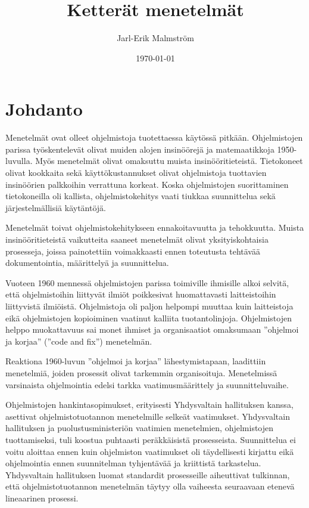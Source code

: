\documentclass[finnish]{tktltiki2}
\title{Ketterät menetelmät}
\author{Jarl-Erik Malmström}
\date{\today}
\theoremstyle{definition}
\theoremstyle{remark}
\begin{document}

\maketitle        %
\makeabstract     %

\tableofcontents  %
\newpage          %



\section{Johdanto}
 
Menetelmät ovat olleet ohjelmistoja tuotettaessa käytössä pitkään. Ohjelmistojen parissa työskentelevät olivat muiden alojen insinöörejä ja matemaatikkoja 1950-luvulla. Myös menetelmät olivat omaksuttu muista insinööritieteistä. Tietokoneet olivat kookkaita sekä käyttökustannukset olivat ohjelmistoja tuottavien insinöörien palkkoihin verrattuna korkeat. Koska ohjelmistojen suorittaminen tietokoneilla oli kallista, ohjelmistokehitys vaati tiukkaa suunnittelua sekä järjestelmällisiä käytäntöjä\cite{BOE06}.   

Menetelmät toivat ohjelmistokehitykseen ennakoitavuutta ja tehokkuutta. Muista insinööritieteistä vaikutteita saaneet menetelmät olivat yksityiskohtaisia prosesseja, joissa painotettiin voimakkaasti ennen toteutusta tehtävää dokumentointia, määrittelyä ja suunnittelua\cite{FOW01a}.

Vuoteen 1960 mennessä ohjelmistojen parissa toimiville ihmisille alkoi selvitä, että ohjelmistoihin liittyvät ilmiöt poikkesivat huomattavasti laitteistoihin liittyvistä ilmiöistä. Ohjelmistoja oli paljon helpompi muuttaa kuin laitteistoja eikä ohjelmistojen kopioiminen vaatinut kalliita tuotantolinjoja. Ohjelmistojen helppo muokattavuus sai monet ihmiset ja organisaatiot omaksumaan ''ohjelmoi ja korjaa'' (''code and fix'') menetelmän\cite{BOE06}.

Reaktiona 1960-luvun ''ohjelmoi ja korjaa'' lähestymistapaan, laadittiin menetelmiä, joiden prosessit olivat tarkemmin organisoituja. Menetelmissä varsinaista ohjelmointia edelsi tarkka vaatimusmäärittely ja suunnitteluvaihe\cite{BOE06}.

Ohjelmistojen hankintasopimukset, erityisesti Yhdysvaltain hallituksen kanssa, asettivat ohjelmistotuotannon menetelmille selkeät vaatimukset. Yhdysvaltain hallituksen ja puolustusministeriön vaatimien menetelmien, ohjelmistojen tuottamiseksi, tuli koostua puhtaasti peräkkäisistä prosesseista. Suunnittelua ei voitu aloittaa ennen kuin ohjelmiston vaatimukset oli täydellisesti kirjattu eikä ohjelmointia ennen suunnitelman tyhjentävää ja kriittistä tarkastelua. Yhdysvaltain hallituksen luomat standardit prosesseille aiheuttivat tulkinnan, että ohjelmistotuotannon menetelmän täytyy olla vaiheesta seuraavaan etenevä lineaarinen prosessi\cite{BOE06}.
\end{document}

